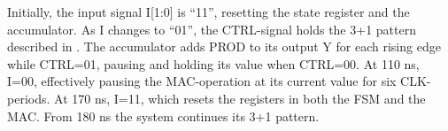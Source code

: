 Initially, the input signal I[1:0] is ``11'', resetting the state register and the accumulator. As I changes to ``01'', the CTRL-signal holds the 3+1 pattern described in \cite[p.3]{project_description}. The accumulator adds PROD to its output Y for each rising edge while CTRL=01, pausing and holding its value when CTRL=00. At 110 ns, I=00, effectively pausing the MAC-operation at its current value for six CLK-periods. At 170 ns, I=11, which resets the registers in both the FSM and the MAC. From 180 ns the system continues its 3+1 pattern.

